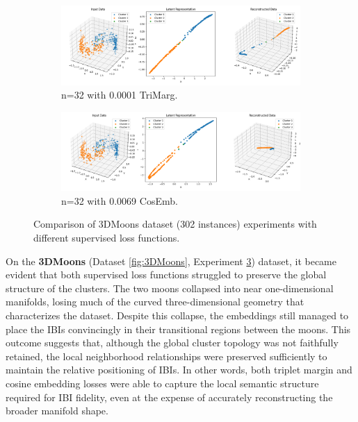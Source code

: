\begin{figure}[htbp]
  \centering
  \begin{subfigure}[b]{1.0\textwidth}
    \centering
    \includegraphics[width=\linewidth]{images/RQ3/tri/3DMoons_32_0.0001.png}
    \caption{n=32 with 0.0001 TriMarg.}
    \label{fig:RQ3/tri/3DMoons}
  \end{subfigure}
  \hfill
  \begin{subfigure}[b]{1.0\textwidth}
    \centering
    \includegraphics[width=\linewidth]{images/RQ3/cos/3DMoons_32_0.0069.png}
    \caption{n=32 with 0.0069 CosEmb.}
    \label{fig:RQ3/cos/3DMoons}
  \end{subfigure} 

  \caption{Comparison of 3DMoons dataset (302 instances) experiments with different
supervised loss functions.}
  \label{fig:RQ3/3DMoons}
\end{figure}

On the \textbf{3DMoons} (Dataset \ref{fig:3DMoons}, Experiment \ref{fig:RQ3/3DMoons}) dataset, it became evident that both supervised loss functions struggled to preserve the global structure of the clusters. The two moons collapsed into near one-dimensional manifolds, losing much of the curved three-dimensional geometry that characterizes the dataset. Despite this collapse, the embeddings still managed to place the IBIs convincingly in their transitional regions between the moons. This outcome suggests that, although the global cluster topology was not faithfully retained, the local neighborhood relationships were preserved sufficiently to maintain the relative positioning of IBIs. In other words, both triplet margin and cosine embedding losses were able to capture the local semantic structure required for IBI fidelity, even at the expense of accurately reconstructing the broader manifold shape.

